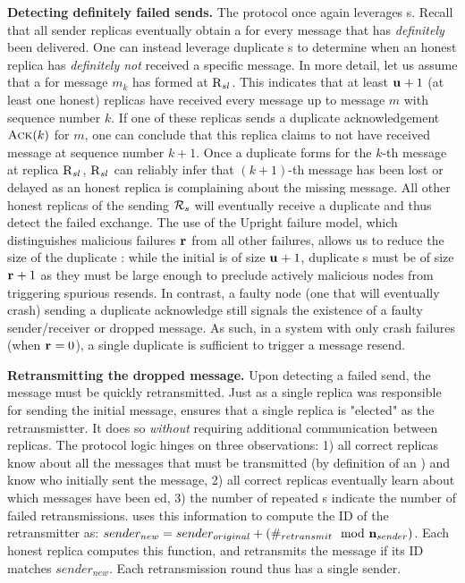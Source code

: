 \par \textbf{Detecting definitely failed sends.} The protocol once again leverages \quack{}s.   Recall that all sender replicas eventually obtain a \quack{} for every message that has \textit{definitely} been delivered. One can instead leverage duplicate 
\quack{}s to determine when an honest replica has \textit{definitely not} received a specific message. 
In more detail, let us assume that a \quack{} for message $m_k$ has formed at $\textsc{R}_{{s}{l}}$. 
This \quack{} indicates that at least $\textbf{u}_{} + 1$ (at least one honest) replicas have received every message up to message $m$ with sequence number $k$.  
If one of these replicas sends a duplicate acknowledgement $\textsc{Ack}(k)$ for $m$, one can conclude that this replica claims to not have received message at sequence number $k + 1$. Once a duplicate \quack{} forms for the $k$-th message at replica $\textsc{R}_{{s}{l}}$,  $\textsc{R}_{{s}{l}}$ can reliably infer that $(k+1)$-th message has been lost or delayed as an honest replica is complaining about the missing message. All other honest replicas of the sending \RSM{} $\mathcal{R}_{s}$ will eventually receive a duplicate \quack{} and thus detect the failed exchange.
The use of the Upright failure model, which distinguishes malicious failures $\textbf{r}_{}$ from all other failures, allows us to reduce the size of the duplicate \quack{}: while the initial \quack{} is of size    $\textbf{u}_{} + 1$, duplicate \quack{}s must be of size $\textbf{r}_{} + 1$ as they must be large enough to preclude actively malicious nodes from triggering spurious resends. In contrast, a faulty node (one that will eventually crash) sending a duplicate acknowledge still signals the existence of a faulty sender/receiver or dropped message. As such, in a system with only crash failures (when $\textbf{r}_{}=0$), a single duplicate \Ack{} is sufficient to trigger a message resend.

\par \textbf{Retransmitting the dropped message.} Upon detecting a failed send, the message must be quickly retransmitted. Just as a single replica was responsible for sending the initial message, \Scrooge{} ensures that a single replica is "elected" as the retransmistter. It does so \textit{without} requiring additional communication between replicas. The protocol logic hinges on three observations: 1) all correct replicas know about all the messages that must be transmitted (by definition of an \RSM{}) and know who initially sent the message, 2) all correct replicas eventually learn about which messages have been \quack{}ed,
3) the number of repeated \quack{}s indicate the number of failed retransmissions. 
\Scrooge{} uses this information to compute the ID of the retransmitter as: $sender_{new} = sender_{original} + (\#_{retransmit} \mod \n{sender})$.  Each honest replica computes this function, and retransmits the message if its ID matches $sender_{new}$.  Each retransmission round thus has a single sender.


